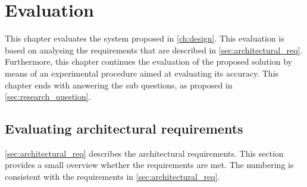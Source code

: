 \chapter{Evaluation}\label{ch:evaluation}
This chapter evaluates the system proposed in \autoref{ch:design}. This evaluation is based on analysing the requirements that are described in \autoref{sec:architectural_req}. Furthermore, this chapter continues the evaluation of the proposed solution by means of an experimental procedure aimed at evaluating its accuracy. This chapter ends with answering the sub questions, as proposed in \autoref{sec:research_question}.

\section{Evaluating architectural requirements}
\autoref{sec:architectural_req} describes the architectural requirements. This section provides a small overview whether the requirements are met. The numbering is consistent with the requirements in \autoref{sec:architectural_req}.

